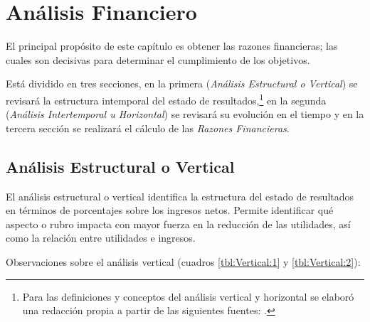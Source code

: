 \chapter{Análisis Financiero}
\label{cap:AnalsisFinanciero}


El principal propósito de este capítulo es obtener las razones financieras; las cuales son decisivas para determinar el cumplimiento de los objetivos.

Está dividido en tres secciones, en la primera (\emph{Análisis Estructural o Vertical}) se revisará la estructura intemporal del estado de resultados,\footnote{Para las definiciones y conceptos del análisis vertical y horizontal se elaboró una redacción propia a partir de las siguientes fuentes: \citep{brock1987contabilidad, mejia2006diccionario, dobarganes2005contabilidad}.} en la segunda (\emph{Análisis Intertemporal u Horizontal}) se revisará su evolución en el tiempo y en la tercera sección se realizará el cálculo de las \emph{Razones Financieras}.

\section{Análisis Estructural o Vertical}
\label{sec:AnalisisVertical}

El análisis estructural o vertical identifica la estructura del estado de resultados en términos de porcentajes sobre los ingresos netos. Permite identificar qué aspecto o rubro impacta con mayor fuerza en la reducción de las utilidades, así como la relación entre utilidades e ingresos.

Observaciones sobre el análisis vertical (cuadros \ref{tbl:Vertical:1} y \ref{tbl:Vertical:2}):

